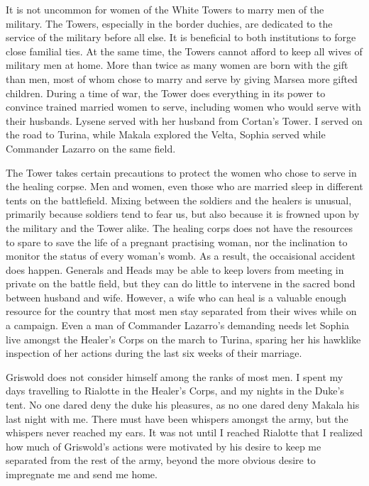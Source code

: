\documentclass{article}
\begin{document}
It is not uncommon for women of the White Towers to marry men of the military. The Towers, especially in the border duchies, are dedicated to the service of the military before all else. It is beneficial to both institutions to forge close familial ties. At the same time, the Towers cannot afford to keep all wives of military men at home. More than twice as many women are born with the gift than men, most of whom chose to marry and serve by giving Marsea more gifted children. During a time of war, the Tower does everything in its power to convince trained married women to serve, including women who would serve with their husbands. Lysene served with her husband from Cortan's Tower. I served on the road to Turina, while Makala explored the Velta, Sophia served while Commander Lazarro on the same field.

The Tower takes certain precautions to protect the women who chose to serve in the healing corpse. Men and women, even those who are married sleep in different tents on the battlefield. Mixing between the soldiers and the healers is unusual, primarily because soldiers tend to fear us, but also because it is frowned upon by the military and the Tower alike. The healing corps does not have the resources to spare to save the life of a pregnant practising woman, nor the inclination to monitor the status of every woman's womb. As a result, the occaisional accident does happen. Generals and Heads may be able to keep lovers from meeting in private on the battle field, but they can do little to intervene in the sacred bond between husband and wife. However, a wife who can heal is a valuable enough resource for the country that most men stay separated from their wives while on a campaign. Even a man of Commander Lazarro's demanding needs let Sophia live amongst the Healer's Corps on the march to Turina, sparing her his hawklike inspection of her actions during the last six weeks of their marriage. 

Griswold does not consider himself among the ranks of most men. I spent my days travelling to Rialotte in the Healer's Corps, and my nights in the Duke's tent. No one dared deny the duke his pleasures, as no one dared deny Makala his last night with me. There must have been whispers amongst the army, but the whispers never reached my ears. It was not until I reached Rialotte that I realized how much of Griswold's actions were motivated by his desire to keep me separated from the rest of the army, beyond the more obvious desire to impregnate me and send me home.
\end{document}
